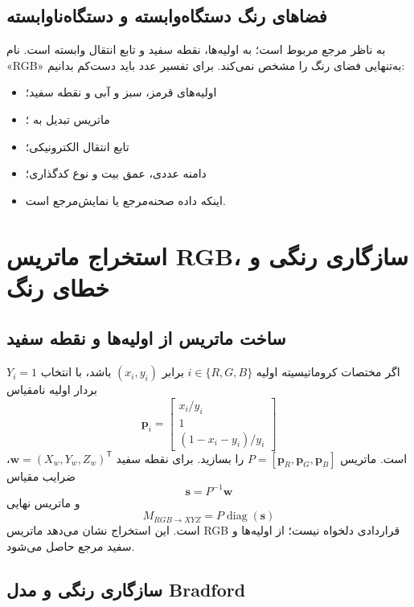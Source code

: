 \documentclass[12pt,openany,oneside]{book}
\newcommand{\trans}{^{\mathsf T}}
\newcommand{\vect}[1]{\bm{#1}}
\newcommand{\diag}{\operatorname{diag}}
\begin{document}
\subsection{فضاهای رنگ دستگاه‌وابسته و دستگاه‌ناوابسته}

 به ناظر مرجع مربوط است؛  به اولیه‌ها، نقطه سفید و تابع انتقال وابسته است.
نام «RGB» به‌تنهایی فضای رنگ را مشخص نمی‌کند. برای تفسیر عدد باید دست‌کم بدانیم:
\begin{itemize}
\item اولیه‌های قرمز، سبز و آبی و نقطه سفید؛
\item ماتریس تبدیل به ؛
\item تابع انتقال الکترونیکی؛
\item دامنه عددی، عمق بیت و نوع کدگذاری؛
\item اینکه داده صحنه‌مرجع یا نمایش‌مرجع است.
\end{itemize}


\section{استخراج ماتریس RGB، سازگاری رنگی و خطای رنگ}

\subsection{ساخت ماتریس از اولیه‌ها و نقطه سفید}

اگر مختصات کروماتیسیته اولیه \(i\in\{R,G,B\}\) برابر \((x_i,y_i)\) باشد، با انتخاب
\(Y_i=1\) بردار اولیه نامقیاس
\begin{equation}
\vect p_i=\begin{bmatrix}x_i/y_i\\1\\(1-x_i-y_i)/y_i\end{bmatrix}
\end{equation}
است. ماتریس \(P=[\vect p_R,\vect p_G,\vect p_B]\) را بسازید. برای نقطه سفید
\(\vect w=(X_w,Y_w,Z_w)\trans\)، ضرایب مقیاس
\begin{equation}
\vect s=P^{-1}\vect w
\end{equation}
و ماتریس نهایی
\begin{equation}
M_{RGB\to XYZ}=P\diag(\vect s)
\label{eq:rgbxyz-from-primaries}
\end{equation}
است. این استخراج نشان می‌دهد ماتریس RGB قراردادی دلخواه نیست؛ از اولیه‌ها و سفید مرجع حاصل می‌شود.

\subsection{سازگاری رنگی و مدل Bradford}
\end{document}
